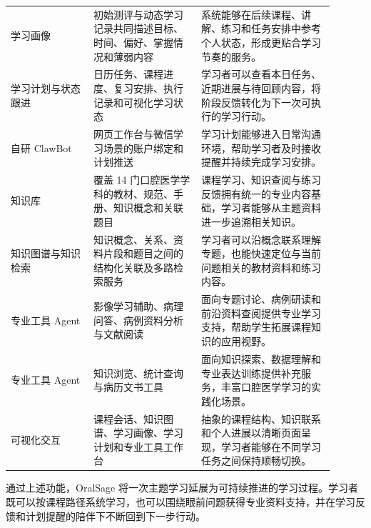 {\begin{longtable}{p{0.23\linewidth}p{0.30\linewidth}p{0.37\linewidth}}
  学习画像 & 初始测评与动态学习记录共同描述目标、时间、偏好、掌握情况和薄弱内容 & 系统能够在后续课程、讲解、练习和任务安排中参考个人状态，形成更贴合学习节奏的服务。 \\
  学习计划与状态跟进 & 日历任务、课程进度、复习安排、执行记录和可视化学习状态 & 学习者可以查看本日任务、近期进展与待回顾内容，将阶段反馈转化为下一次可执行的学习行动。 \\
  自研 ClawBot & 网页工作台与微信学习场景的账户绑定和计划推送 & 学习计划能够进入日常沟通环境，帮助学习者及时接收提醒并持续完成学习安排。 \\
  知识库 & 覆盖 14 门口腔医学学科的教材、规范、手册、知识概念和关联题目 & 课程学习、知识查阅与练习反馈拥有统一的专业内容基础，学习者能够从主题资料进一步追溯相关知识。 \\
  知识图谱与知识检索 & 知识概念、关系、资料片段和题目之间的结构化关联及多路检索服务 & 学习者可以沿概念联系理解专题，也能快速定位与当前问题相关的教材资料和练习内容。 \\
  专业工具 Agent & 影像学习辅助、病理问答、病例资料分析与文献阅读 & 面向专题讨论、病例研读和前沿资料查阅提供专业学习支持，帮助学生拓展课程知识的应用视野。 \\
  专业工具 Agent & 知识浏览、统计查询与病历文书工具 & 面向知识探索、数据理解和专业表达训练提供补充服务，丰富口腔医学学习的实践化场景。 \\
  可视化交互 & 课程会话、知识图谱、学习画像、学习计划和专业工具工作台 & 抽象的课程结构、知识联系和个人进展以清晰页面呈现，学习者能够在不同学习任务之间保持顺畅切换。 \\
\end{longtable}
}

通过上述功能，OralSage 将一次主题学习延展为可持续推进的学习过程。学习者既可以按课程路径系统学习，也可以围绕眼前问题获得专业资料支持，并在学习反馈和计划提醒的陪伴下不断回到下一步行动。
